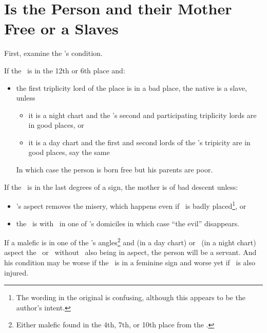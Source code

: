 \section{Is the Person and their Mother Free or a Slaves}

First, examine the \Moon's condition. 

If the \Moon\, is in the 12th or 6th place and:
\begin{itemize}[topsep=0em, itemsep=0em]
\item the first triplicity lord of the place is in a bad place, the native is a slave, unless
\begin{itemize}[topsep=0em, itemsep=0em]
\item it is a night chart and the \Moon's second and participating triplicity lords are in good places, or
\item it is a day chart and the first and second lords of the \Sun's tripicity are in good places, say the same
\end{itemize}
In which case the person is born free but his parents are poor.
\end{itemize}

If the \Moon\, is in the last degrees of a sign, the mother is of bad descent unless:
\begin{itemize}[topsep=0em, itemsep=0em]
\item  \Jupiter's aspect removes the misery, which happens even if \Jupiter\, is badly placed\footnote{The wording in the original is confusing, although this appears to be the author's intent.}, or

\item the \Moon\, is with \Venus\, in one of \Venus's domiciles in which case ``the evil'' disappears.
\end{itemize}

If a malefic is in one of the \Moon's angles\footnote{Either malefic found in the 4th, 7th, or 10th place from the \Moon.} and \Mars (in a day chart) or \Saturn\, (in a night chart) aspect the \Sun\, or \Moon\, without \Jupiter\, also being in aspect, the person will be a servant. And his condition may be worse if the \Moon\, is in a feminine sign and worse yet if \Venus\, is also injured.


